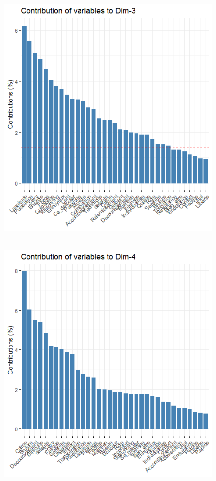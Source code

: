 \documentclass[12pt]{article}
\begin{document}
\begin{figure}[H]
\begin{center}
\includegraphics[scale=1.3]{ACP_4.png} 
\caption[]{\ }
\end{center}
\end{figure}


\begin{figure}[H]
\begin{center}
\includegraphics[scale=1.3]{ACP_5.png} 
\caption[]{\ }
\end{center}
\end{figure}
\end{document}
